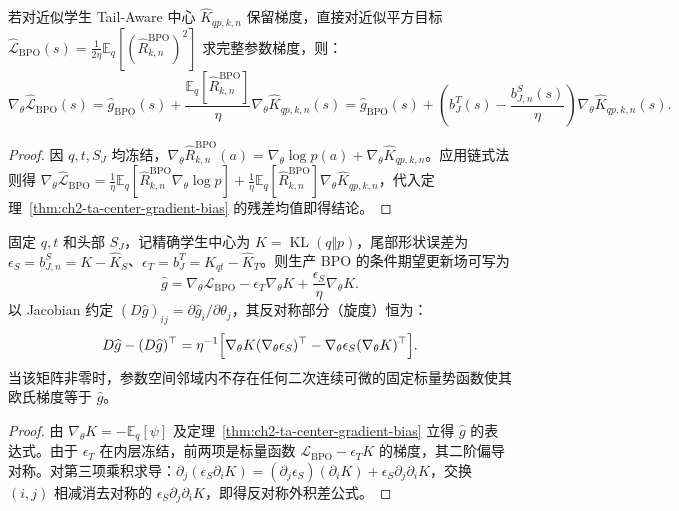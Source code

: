 \documentclass[lang=cn,scheme=chinese,openany]{elegantbook}
\newcommand{\E}{\mathbb E}
\newcommand{\KL}{\operatorname{KL}}
\begin{document}
\begin{proposition}
\label{prop:ch2-ta-square-versus-sg}
\label{opd:approximate-square}
若对近似学生 Tail-Aware 中心 $\widehat K_{qp,k,n}$ 保留梯度，直接对近似平方目标 $\widehat{\mathcal L}_{\mathrm{BPO}}(s)=\frac1{2\eta}\mathbb E_q[(\widehat R_{k,n}^{\mathrm{BPO}})^2]$ 求完整参数梯度，则：
\begin{equation}
 \nabla_\theta\widehat{\mathcal L}_{\mathrm{BPO}}(s)
 =\widehat g_{\mathrm{BPO}}(s)
 +\frac{\mathbb E_q[\widehat R_{k,n}^{\mathrm{BPO}}]}{\eta}\nabla_\theta\widehat K_{qp,k,n}(s)
 =\widehat g_{\mathrm{BPO}}(s)
 +\left(b_J^T(s)-\frac{b_{J,n}^S(s)}{\eta}\right)
   \nabla_\theta\widehat K_{qp,k,n}(s).
\end{equation}
\end{proposition}
\begin{proof}
因 $q,t,S_J$ 均冻结，$\nabla_\theta\widehat R_{k,n}^{\mathrm{BPO}}(a)=\nabla_\theta\log p(a)+\nabla_\theta\widehat K_{qp,k,n}$。应用链式法则得 $\nabla_\theta\widehat{\mathcal L}_{\mathrm{BPO}}=\frac1\eta\E_q[\widehat R_{k,n}^{\mathrm{BPO}}\nabla_\theta\log p]+\frac1\eta\E_q[\widehat R_{k,n}^{\mathrm{BPO}}]\nabla_\theta\widehat K_{qp,k,n}$，代入定理~\ref{thm:ch2-ta-center-gradient-bias} 的残差均值即得结论。
\end{proof}

\begin{theorem}
\label{opd:field-curl}
固定 $q,t$ 和头部 $S_J$，记精确学生中心为 $K=\KL(q\Vert p)$，尾部形状误差为 $\epsilon_S=b_{J,n}^S=K-\widehat K_S$、$\epsilon_T=b_J^T=K_{qt}-\widehat K_T$。则生产 BPO 的条件期望更新场可写为
\begin{equation}
\widehat g=\nabla_\theta \mathcal L_{\mathrm{BPO}}-\epsilon_T\nabla_\theta K+\frac{\epsilon_S}{\eta}\nabla_\theta K.
\end{equation}
以 Jacobian 约定 $(D\widehat g)_{ij}=\partial \widehat g_i/\partial\theta_j$，其反对称部分（旋度）恒为：
\begin{equation}
D\widehat g-(D\widehat g)^\top
=\eta^{-1}\Bigl[\nabla_\theta K(\nabla_\theta\epsilon_S)^\top-\nabla_\theta\epsilon_S(\nabla_\theta K)^\top\Bigr].
\end{equation}
当该矩阵非零时，参数空间邻域内不存在任何二次连续可微的固定标量势函数使其欧氏梯度等于 $\widehat g$。
\end{theorem}
\begin{proof}
由 $\nabla_\theta K=-\E_q[\psi]$ 及定理~\ref{thm:ch2-ta-center-gradient-bias} 立得 $\widehat g$ 的表达式。由于 $\epsilon_T$ 在内层冻结，前两项是标量函数 $\mathcal L_{\mathrm{BPO}}-\epsilon_T K$ 的梯度，其二阶偏导对称。对第三项乘积求导：$\partial_j(\epsilon_S\partial_i K)=(\partial_j\epsilon_S)(\partial_i K)+\epsilon_S\partial_j\partial_i K$，交换 $(i,j)$ 相减消去对称的 $\epsilon_S\partial_j\partial_i K$，即得反对称外积差公式。
\end{proof}
\end{document}
